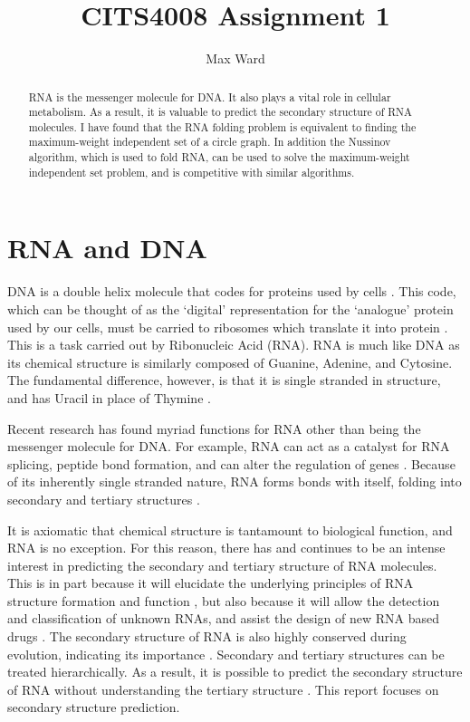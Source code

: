 \documentclass[12pt, a4paper]{article}
\title{CITS4008 Assignment 1}
\author{Max Ward}
\begin{document}
\maketitle

\begin{abstract}
RNA is the messenger molecule for DNA. It also plays a vital role in cellular metabolism. As a result, it is valuable to predict the secondary structure of RNA molecules. I have found that the RNA folding problem is equivalent to finding the maximum-weight independent set of a circle graph. In addition the Nussinov algorithm, which is used to fold RNA, can be used to solve the maximum-weight independent set problem, and is competitive with similar algorithms.
\end{abstract}

\section*{RNA and DNA} 
DNA is a double helix molecule that codes for proteins used by cells \cite{albertsessential}. This
code, which can be thought of as the `digital' representation for the `analogue'
protein used by our cells, must be carried to ribosomes which translate it into
protein \cite{albertsessential}. This is a task carried out by Ribonucleic Acid (RNA). RNA is much like DNA as its chemical structure is similarly composed of Guanine, Adenine, and Cytosine. The fundamental difference, however, is that it is single stranded in structure, and has Uracil in place of Thymine \cite{albertsessential}.

Recent research has found myriad functions for RNA other than being the messenger molecule for DNA. For example, RNA can act as a catalyst for RNA
splicing, peptide bond formation, and can alter the regulation of genes
\cite{xu2012statistical}. Because of its inherently single stranded nature, RNA forms bonds with itself, folding into
secondary and tertiary structures \cite{conn1998rna}.

It is axiomatic that chemical structure is tantamount to biological function, and RNA is no exception. For this reason, there has and continues to be an intense
interest in predicting the secondary and tertiary structure of RNA
molecules. This is in part because it will elucidate the underlying principles of
RNA structure formation and function \cite{conn1998rna}, but also because it will allow the
detection and classification of unknown RNAs, and assist the design of new RNA based drugs \cite{condon2003problems}. The secondary structure of RNA
is also highly conserved during evolution, indicating its importance \cite{hofacker2008rna}. Secondary
and tertiary structures can be treated hierarchically. As a result, it is possible to
predict the secondary structure of RNA without understanding the tertiary
structure \cite{tinoco1999rna}. This report focuses on secondary structure prediction.
\end{document}
